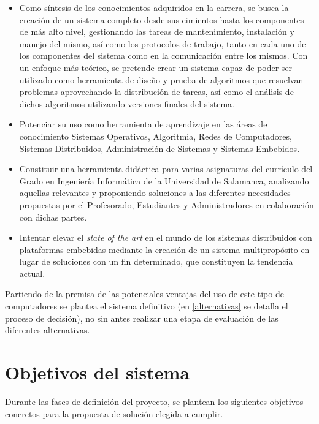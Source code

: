 \begin{itemize}
	\item Como síntesis de los conocimientos adquiridos en la carrera, se busca la creación de un sistema completo desde sus cimientos hasta los componentes de más alto nivel, gestionando las tareas de mantenimiento, instalación y manejo del mismo, así como los protocolos de trabajo, tanto en cada uno de los componentes del sistema como en la comunicación entre los mismos. Con un enfoque más teórico, se pretende crear un sistema capaz de poder ser utilizado como herramienta de diseño y prueba de algoritmos que resuelvan problemas aprovechando la distribución de tareas, así como el análisis de dichos algoritmos utilizando versiones finales del sistema.

	\item Potenciar su uso como herramienta de aprendizaje en las áreas de conocimiento Sistemas Operativos, Algoritmia, Redes de Computadores, Sistemas Distribuidos, Administración de Sistemas y Sistemas Embebidos.
	
	\item Constituir una herramienta didáctica para varias asignaturas del currículo del Grado en Ingeniería Informática de la Universidad de Salamanca, analizando aquellas relevantes y proponiendo soluciones a las diferentes necesidades propuestas por el Profesorado, Estudiantes y Administradores en colaboración con dichas partes.

	\item Intentar elevar el \textit{state of the art} en el mundo de los sistemas distribuidos con plataformas embebidas mediante la creación de un sistema multipropósito en lugar de soluciones con un fin determinado, que constituyen la tendencia actual.
\end{itemize}

Partiendo de la premisa de las potenciales ventajas del uso de este tipo de computadores se plantea el sistema definitivo (en \ref{alternativas} se detalla el proceso de decisión), no sin antes realizar una etapa de evaluación de las diferentes alternativas.

\section{Objetivos del sistema}

Durante las fases de definición del proyecto, se plantean los siguientes objetivos concretos para la propuesta de solución elegida a cumplir.

